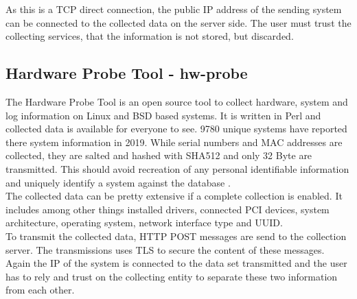         As this is a TCP direct connection, the public IP address of the sending system can be connected to the collected data on the server side.
        The user must trust the collecting services, that the information is not stored, but discarded.\\
        
    \subsection{Hardware Probe Tool - hw-probe}
        The Hardware Probe Tool is an open source tool to collect hardware, system and log information on Linux and BSD based systems. It is written in Perl and collected data is available for everyone to see. 9780 unique systems have reported there system information in 2019\cite{ponomarenko_linux_nodate}.
        While serial numbers and MAC addresses are collected, they are salted and hashed with SHA512 and only 32 Byte are transmitted. 
        This should avoid recreation of any personal identifiable information and uniquely identify a system against the database \cite{project_linuxhwhw-probe_2020}.\\
        The collected data can be pretty extensive if a complete collection is enabled. It includes among other things installed drivers, connected PCI devices, system architecture, operating system, network interface type and UUID\cite{project_linuxhwhw-probe_2020}.\\
        
        To transmit the collected data, HTTP POST messages are send to the collection server. The transmissions uses TLS to secure the content of these messages\cite{project_linuxhwhw-probe_2020}.\\
        Again the IP of the system is connected to the data set transmitted and the user has to rely and trust on the collecting entity to separate these two information from each other.\\
    


\newpage
